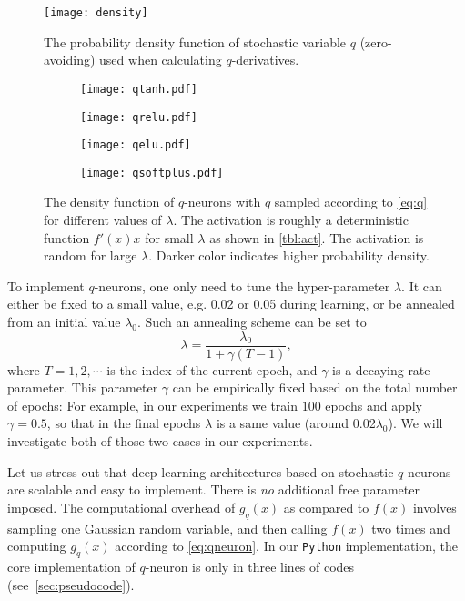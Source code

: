 \documentclass{article}
\DeclareMathOperator{\relu}{\mathrm{relu}}
\DeclareMathOperator{\elu}{\mathrm{elu}}
\begin{document}
\begin{figure} %
\centering
\texttt{[image: density]}
\caption{The probability density function of stochastic variable $q$ (zero-avoiding) used when calculating $q$-derivatives.}\label{fig:q}
\end{figure}
\begin{figure*}[!ht]
\centering
\begin{subfigure}[b]{.9\textwidth}
\texttt{[image: qtanh.pdf]}
\end{subfigure}
\begin{subfigure}[b]{.9\textwidth}
\texttt{[image: qrelu.pdf]}
\end{subfigure}
\begin{subfigure}[b]{.9\textwidth}
\texttt{[image: qelu.pdf]}
\end{subfigure}
\begin{subfigure}[b]{.9\textwidth}
\texttt{[image: qsoftplus.pdf]}
\end{subfigure}
\caption{The density function of $q$-neurons with 
$q$ sampled according to \cref{eq:q} for different
values of $\lambda$.
The activation is roughly a deterministic function $f'(x)x$ for small $\lambda$ as shown in \cref{tbl:act}.
The activation is random for large $\lambda$.
Darker color indicates higher probability density.}
\end{figure*}

To implement $q$-neurons, one only need to tune the hyper-parameter $\lambda$.
It can either be fixed to a small value, e.g. 0.02 or 0.05 during learning,
or be annealed from an initial value $\lambda_0$.
Such an annealing scheme can be set to
\begin{equation}\label{eq:anneal}
\lambda = \frac{\lambda_0}{1+\gamma (T-1)},
\end{equation}
where $T=1,2,\cdots$ is the index of the current epoch, and $\gamma$ is a decaying rate parameter.
This parameter $\gamma$ can be empirically fixed based on the total number of epochs: 
For example, in our experiments we train $100$ epochs and apply $\gamma=0.5$,
so that in the final epochs $\lambda$ is a same value (around 0.02$\lambda_0$).
We will investigate both of those two cases in our experiments.

Let us stress out that deep learning architectures based on stochastic $q$-neurons are scalable
and easy to implement.  There is {\em no} additional free parameter imposed.
The computational overhead of $g_q(x)$ as compared to $f(x)$
involves sampling one Gaussian random variable, and then 
calling $f(x)$ two times and computing $g_q(x)$ according to \cref{eq:qneuron}.
In our \texttt{Python} implementation, the core implementation of $q$-neuron 
is only in three lines of codes (see~\ref{sec:pseudocode}).
\end{document}
